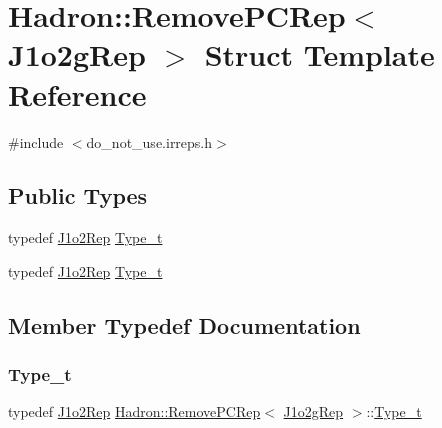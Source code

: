 \hypertarget{structHadron_1_1RemovePCRep_3_01J1o2gRep_01_4}{}\section{Hadron\+:\+:Remove\+P\+C\+Rep$<$ J1o2g\+Rep $>$ Struct Template Reference}
\label{structHadron_1_1RemovePCRep_3_01J1o2gRep_01_4}


{\ttfamily \#include $<$do\+\_\+not\+\_\+use.\+irreps.\+h$>$}

\subsection*{Public Types}
\begin{DoxyCompactItemize}
\item 
typedef \mbox{\hyperlink{structHadron_1_1J1o2Rep}{J1o2\+Rep}} \mbox{\hyperlink{structHadron_1_1RemovePCRep_3_01J1o2gRep_01_4_a67f5c615c77485f1e07838b2ef1e6317}{Type\+\_\+t}}
\item 
typedef \mbox{\hyperlink{structHadron_1_1J1o2Rep}{J1o2\+Rep}} \mbox{\hyperlink{structHadron_1_1RemovePCRep_3_01J1o2gRep_01_4_a67f5c615c77485f1e07838b2ef1e6317}{Type\+\_\+t}}
\end{DoxyCompactItemize}


\subsection{Member Typedef Documentation}
\mbox{\label{structHadron_1_1RemovePCRep_3_01J1o2gRep_01_4_a67f5c615c77485f1e07838b2ef1e6317}} 
\subsubsection{\texorpdfstring{Type\_t}{Type\_t}\hspace{0.1cm}{\footnotesize\ttfamily [1/2]}}
{\footnotesize\ttfamily typedef \mbox{\hyperlink{structHadron_1_1J1o2Rep}{J1o2\+Rep}} \mbox{\hyperlink{structHadron_1_1RemovePCRep}{Hadron\+::\+Remove\+P\+C\+Rep}}$<$ \mbox{\hyperlink{structHadron_1_1J1o2gRep}{J1o2g\+Rep}} $>$\+::\mbox{\hyperlink{structHadron_1_1RemovePCRep_3_01J1o2gRep_01_4_a67f5c615c77485f1e07838b2ef1e6317}{Type\+\_\+t}}}

